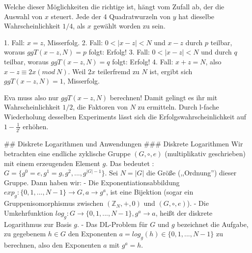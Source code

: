 \documentclass[a4paper]{article}
\begin{document}
\begin{multicols}{3}
{{{{Welche dieser Möglichkeiten die richtige ist, hängt vom Zufall ab, der die Auswahl von $x$ steuert. Jede der 4 Quadratwurzeln von $y$ hat dieselbe Wahrscheinlichkeit $1/4$, als $x$ gewählt worden zu sein.

1. Fall: $x=z$, Misserfolg.
2. Fall: $0<|x-z|< N$ und $x-z$ durch $p$ teilbar, woraus $ggT(x-z,N) =p$ folgt: Erfolg!
3. Fall: $0<|x-z|< N$ und durch $q$ teilbar, woraus $ggT(x-z,N) =q$ folgt: Erfolg!
4. Fall: $x+z=N$, also $x-z\equiv 2x(mod\ N)$. Weil $2x$ teilerfremd zu $N$ ist, ergibt sich $ggT(x-z,N)=1$, Misserfolg.

Eva muss also nur $ggT(x-z,N)$ berechnen! Damit gelingt es ihr mit Wahrscheinlichkeit $1/2$, die Faktoren von $N$ zu ermitteln. Durch l-fache Wiederholung desselben Experiments lässt sich die Erfolgswahrscheinlichkeit auf $1-\frac{1}{2^l}$ erhöhen.

## Diskrete Logarithmen und Anwendungen
### Diskrete Logarithmen
Wir betrachten eine endliche zyklische Gruppe $(G,\circ,e)$ (multiplikativ geschrieben) mit einem erzeugenden Element $g$. Das bedeutet : $G=\{g^0=e,g^1=g,g^2,...,g^{|G|- 1}\}$. Sei $N=|G|$ die Größe (,,Ordnung'') dieser Gruppe. Dann haben wir: 
- Die Exponentiationsabbildung $exp_g:\{0,1,...,N-1\}\rightarrow G, a\rightarrow g^a$, ist eine Bijektion (sogar ein Gruppenisomorphismus zwischen $(\mathbb{Z}_N,+,0)$ und $(G,\circ,e)$).
- Die Umkehrfunktion $log_g:G\rightarrow\{0,1,...,N-1\},g^a\rightarrow a$, heißt der diskrete Logarithmus zur Basis $g$.
- Das DL-Problem für $G$ und $g$ bezeichnet die Aufgabe, zu gegebenem $h\in G$ den Exponenten $a=log_g (h) \in\{0,1,...,N-1\}$ zu berechnen, also den Exponenten $a$ mit $g^a=h$.

}}}}
\end{multicols}
\end{document}
